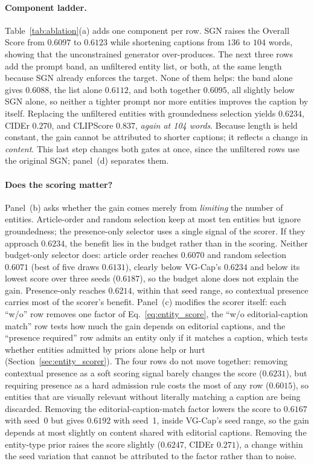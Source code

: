\documentclass[runningheads]{llncs}
\DeclareRobustCommand{\aciids}[1]{{\color{olive}#1}}
\DeclareRobustCommand{\revise}[1]{{\color{olive}#1}}
\DeclareRobustCommand{\aciids}[1]{#1}
\DeclareRobustCommand{\revise}[1]{#1}
\begin{document}
\paragraph{Component ladder.} \aciids{Table~\ref{tab:ablation}(a) adds one component per row.} SGN raises the Overall Score from $0.6097$ to $0.6123$ while shortening captions from $136$ to $104$ words, showing that the unconstrained generator over-produces. \aciids{The next three rows add the prompt band, an unfiltered entity list, or both, at the same length because SGN already enforces the target. None of them helps: the band alone gives $0.6088$, the list alone $0.6112$, and both together $0.6095$, all slightly below SGN alone, so neither a tighter prompt nor more entities improves the caption by itself.} Replacing the unfiltered entities with groundedness selection yields $0.6234$, CIDEr $0.270$, and CLIPScore $0.837$, \emph{again at 104 words}. Because length is held constant, the gain cannot be attributed to shorter captions; it reflects a change in \emph{content}. \aciids{This last step changes both gates at once, since the unfiltered rows use the original SGN; panel~(d) separates them.}

\paragraph{\aciids{Does the scoring matter?}} \aciids{Panel~(b) asks whether the gain comes merely from \emph{limiting} the number of entities. Article-order and random selection keep at most ten entities but ignore groundedness; the presence-only selector uses a single signal of the scorer. If they approach $0.6234$, the benefit lies in the budget rather than in the scoring.} \revise{Neither budget-only selector does: article order reaches $0.6070$ and random selection $0.6071$ (best of five draws $0.6131$), clearly below VG-Cap's $0.6234$ and below its lowest score over three seeds ($0.6187$), so the budget alone does not explain the gain. Presence-only reaches $0.6214$, within that seed range, so contextual presence carries most of the scorer's benefit.} \aciids{Panel~(c) modifies the scorer itself: each ``w/o'' row removes one factor of Eq.~\eqref{eq:entity_score}, the ``w/o editorial-caption match'' row tests how much the gain depends on editorial captions, and the ``presence required'' row admits an entity only if it matches a caption, which tests whether entities admitted by priors alone help or hurt (Section~\ref{sec:entity_scorer}).} The four rows do not move together: removing contextual presence as a soft scoring signal barely changes the score ($0.6231$), but requiring presence as a hard admission rule costs the most of any row ($0.6015$), so entities that are visually relevant without literally matching a caption are being discarded. \revise{Removing the editorial-caption-match factor lowers the score to $0.6167$ with seed~0 but gives $0.6192$ with seed~1, inside VG-Cap's seed range, so the gain depends at most slightly on content shared with editorial captions. Removing the entity-type prior raises the score slightly ($0.6247$, CIDEr $0.271$), a change within the seed variation that cannot be attributed to the factor rather than to noise.}
\end{document}
